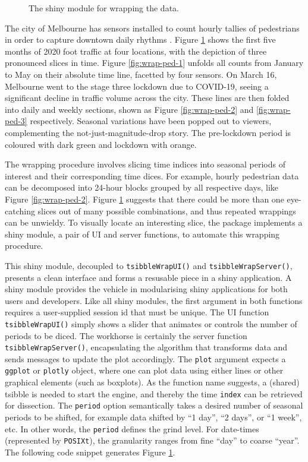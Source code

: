 \begin{Schunk}
\begin{figure}
{}

\caption[The shiny module for wrapping the  data]{The shiny module for wrapping the  data.}\label{fig:wrap-ped}
\end{figure}
\end{Schunk}

The city of Melbourne has sensors installed to count hourly tallies of
pedestrians in order to capture downtown daily rhythms \citep{ped}.
Figure \ref{fig:wrap-ped} shows the first five months of 2020 foot
traffic at four locations, with the depiction of three pronounced slices
in time. Figure \ref{fig:wrap-ped-1} unfolds all counts from January to
May on their absolute time line, facetted by four sensors. On March 16,
Melbourne went to the stage three lockdown due to COVID-19, seeing a
significant decline in traffic volume across the city. These lines are
then folded into daily and weekly sections, shown as Figure
\ref{fig:wrap-ped-2} and \ref{fig:wrap-ped-3} respectively. Seasonal
variations have been popped out to viewers, complementing the
not-just-magnitude-drop story. The pre-lockdown period is coloured with
dark green and lockdown with orange.

The wrapping procedure involves slicing time indices into seasonal
periods of interest and their corresponding time dices. For example,
hourly pedestrian data can be decomposed into 24-hour blocks grouped by
all respective days, like Figure \ref{fig:wrap-ped-2}. Figure
\ref{fig:wrap-ped} suggests that there could be more than one
eye-catching slices out of many possible combinations, and thus repeated
wrappings can be unwieldy. To visually locate an interesting slice, the
 package implements a shiny module, a pair of UI
and server functions, to automate this wrapping procedure.

This shiny module, decoupled to \texttt{tsibbleWrapUI()} and
\texttt{tsibbleWrapServer()}, presents a clean interface and forms a
resusable piece in a shiny application. A shiny module provides the
vehicle in modularising shiny applications for both users and
developers. Like all shiny modules, the first argument in both functions
requires a user-supplied session id that must be unique. The UI function
\texttt{tsibbleWrapUI()} simply shows a slider that animates or controls
the number of periods to be diced. The workhorse is certainly the server
function \texttt{tsibbleWrapServer()}, encapsulating the algorithm that
transforms data and sends messages to update the plot accordingly. The
\texttt{plot} argument expects a \texttt{ggplot} or \texttt{plotly}
object, where one can plot data using either lines or other graphical
elements (such as boxplots). As the function name suggests, a (shared)
tsibble is needed to start the engine, and thereby the time
\texttt{index} can be retrieved for dissection. The \texttt{period}
option semantically takes a desired number of seasonal periods to be
shifted, for example data shifted by ``1 day'', ``2 days'', or ``1
week'', etc. In other words, the \texttt{period} defines the grind
level. For date-times (represented by \texttt{POSIXt}), the granularity
ranges from fine ``day'' to coarse ``year''. The following code snippet
generates Figure \ref{fig:wrap-ped}.

